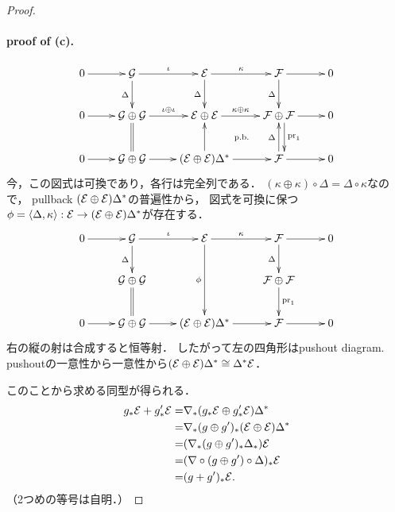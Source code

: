 \documentclass[a4paper]{jsarticle}
\makeatletter
\newcommand{\centerpb}{\ar@{}[lu]|{\text{p.b.}}}
\newcommand{\diag}{\Delta}
\newcommand{\codiag}{\nabla}
\makeatother
\begin{document}
\begin{proof}
        \paragraph{proof of (c).}
        \[\vcenter{\xymatrix{
            0 \ar[r]& \shG \ar[r]^-{\iota}\ar[d]_-{\diag}& \shE \ar[r]^-{\kappa}\ar[d]_-{\diag}& \shF \ar[r]\ar[d]_-{\diag}& 0\\
            0 \ar[r]& \shG \oplus \shG \ar[r]^-{\iota \oplus \iota}&
                      \shE \oplus \shE \ar[r]^-{\kappa \oplus \kappa}& \shF \oplus \shF\ar[r]\ar@<5pt>[d]^-{\pr_1}& 0\\
            0 \ar[r]& \shG \oplus \shG\ar[r]\ar@{=}[u]& (\shE \oplus \shE)\diag^* \ar[r]\ar[u]& \shF \ar[r]\ar[u]^-{\diag}\centerpb& 0 \\
        }}\]
        今，この図式は可換であり，各行は完全列である．
        $(\kappa \oplus \kappa) \circ \diag=\diag \circ \kappa$なので，
        pullback $(\shE \oplus \shE)\diag^*$の普遍性から，
        図式を可換に保つ$\phi=\langle \diag, \kappa \rangle: \shE \to (\shE \oplus \shE)\diag^*$が存在する．
        \[\vcenter{\xymatrix{
            0 \ar[r]& \shG \ar[r]^-{\iota}\ar[d]_-{\diag}& \shE \ar[r]^-{\kappa}\ar[dd]_-{\phi}& \shF \ar[r]\ar[d]_-{\diag}& 0\\
            & \shG \oplus \shG&{}& \shF \oplus \shF \ar[d]^-{\pr_1}&\\
            0 \ar[r]& \shG \oplus \shG\ar[r]\ar@{=}[u]& (\shE \oplus \shE)\diag^* \ar[r]& \shF \ar[r]& 0 \\
        }}\]
        右の縦の射は合成すると恒等射．
        したがって左の四角形はpushout diagram.
        pushoutの一意性から一意性から$(\shE \oplus \shE)\diag^* \iso \diag^* \shE$．

        このことから求める同型が得られる．
        \begin{align*}
            g_*\shE+g'_*\shE
            =&  \codiag_*(g_*\shE \oplus g'_*\shE)\diag^*         \\
            =&  \codiag_*(g \oplus g')_*(\shE \oplus \shE)\diag^* \\
            =&  (\codiag_*(g \oplus g')_*\diag_*)\shE             \\
            =&  (\codiag \circ (g \oplus g') \circ \diag)_*\shE   \\
            =&  (g+g')_*\shE.
        \end{align*}
        （2つめの等号は自明．）
    \end{proof}
    
\end{document}
